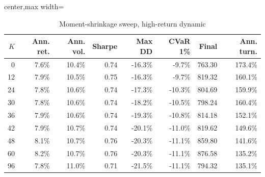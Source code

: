 ﻿\begin{table}[!htbp]
\centering
\caption{Moment-shrinkage sweep, high-return dynamic}
\label{tab:allocation-moment-shrinkage-high-return}
\small
\setlength{\tabcolsep}{5pt}
\renewcommand{\arraystretch}{1.12}
\begin{adjustbox}{center,max width=\linewidth}
\begin{tabular}{rrrrrrrr}
\toprule
$K$ & Ann. ret. & Ann. vol. & Sharpe & Max DD & CVaR 1\% & Final & Ann. turn. \\
\midrule
0 & 7.6\% & 10.4\% & 0.74 & -16.3\% & -9.7\% & 763.30 & 173.4\% \\
12 & 7.9\% & 10.5\% & 0.75 & -16.3\% & -9.7\% & 819.32 & 160.1\% \\
24 & 7.8\% & 10.6\% & 0.74 & -17.3\% & -10.3\% & 804.69 & 159.9\% \\
30 & 7.8\% & 10.6\% & 0.74 & -18.2\% & -10.5\% & 798.24 & 160.4\% \\
36 & 7.9\% & 10.6\% & 0.74 & -19.3\% & -10.8\% & 814.18 & 152.1\% \\
42 & 7.9\% & 10.7\% & 0.74 & -20.1\% & -11.0\% & 819.62 & 149.6\% \\
48 & 8.1\% & 10.7\% & 0.76 & -20.3\% & -11.1\% & 859.80 & 141.6\% \\
60 & 8.2\% & 10.7\% & 0.76 & -20.3\% & -11.1\% & 876.58 & 135.2\% \\
96 & 7.8\% & 11.0\% & 0.71 & -21.5\% & -11.1\% & 794.32 & 135.1\% \\
\bottomrule
\end{tabular}
\end{adjustbox}
\end{table}
